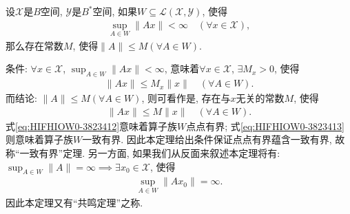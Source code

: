 \documentclass[../../main.tex]{subfiles}%
\begin{document}
\begin{theorem}[共鸣定理或一致有界定理]\label{theorem:泛函分析--共鸣定理}
设$\mathscr{X}$是$B$空间, $\mathscr{Y}$是$B^*$空间, 如果$W\subseteq\mathscr{L}(\mathscr{X},\mathscr{Y})$, 使得
\begin{align*}
\sup_{A\in W}\|Ax\| < \infty \quad (\forall x\in\mathscr{X}),
\end{align*}
那么存在常数$M$, 使得$\|A\|\leqslant M(\forall A\in W)$.
\end{theorem}
\begin{remark}
条件: $\forall x\in\mathscr{X}$, $\sup_{A\in W}\|Ax\|<\infty$, 意味着$\forall x\in\mathscr{X}$, $\exists M_x>0$, 使得
\begin{align}
\|Ax\| \leqslant M_x\|x\| \quad (\forall A\in W).
\label{eq:HIFHIOW0-3823412}
\end{align}
而结论: $\|A\|\leqslant M(\forall A\in W)$, 则可看作是, 存在与$x$无关的常数$M$, 使得
\begin{align}
\|Ax\| \leqslant M\|x\| \quad (\forall A\in W).
\label{eq:HIFHIOW0-3823413}
\end{align}
式\eqref{eq:HIFHIOW0-3823412}意味着算子族$W$点点有界; 式\eqref{eq:HIFHIOW0-3823413}则意味着算子族$W$一致有界. 因此本定理给出条件保证点点有界蕴含一致有界, 故称“一致有界”定理. 另一方面, 如果我们从反面来叙述本定理将有: $\sup_{A\in W}\|A\|=\infty\implies\exists x_0\in\mathscr{X}$, 使得
\begin{align*}
\sup_{A\in W}\|Ax_0\| = \infty.
\end{align*}
因此本定理又有“共鸣定理”之称.
\end{remark}
\end{document}
